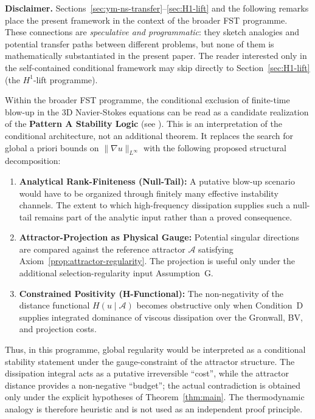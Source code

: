\documentclass[12pt,a4paper]{article}
\theoremstyle{definition}
\theoremstyle{plain}
\theoremstyle{remark}
\begin{document}
\noindent\textbf{Disclaimer.}\;
Sections~\ref{sec:ym-ns-transfer}--\ref{sec:H1-lift} and the following remarks
place the present framework in the context of the broader FST programme.
These connections are \emph{speculative and programmatic}: they sketch
analogies and potential transfer paths between different problems, but
none of them is mathematically substantiated in the present paper.
The reader interested only in the self-contained conditional framework
may skip directly to Section~\ref{sec:H1-lift} (the $H^1$-lift programme).

\medskip
Within the broader FST programme, the conditional exclusion of finite-time blow-up in the 3D Navier-Stokes equations can be read as a candidate realization of the \textbf{Pattern A Stability Logic} (see \cite{FST-Unified2026}). This is an interpretation of the conditional architecture, not an additional theorem. It replaces the search for global a priori bounds on $\|\nabla u\|_{L^\infty}$ with the following proposed structural decomposition:

\begin{enumerate}[label=\alph*)]
    \item \textbf{Analytical Rank-Finiteness (Null-Tail):} A putative blow-up scenario would have to be organized through finitely many effective instability channels. The extent to which high-frequency dissipation supplies such a null-tail remains part of the analytic input rather than a proved consequence.
    \item \textbf{Attractor-Projection as Physical Gauge:} Potential singular directions are compared against the reference attractor $\mathcal{A}$ satisfying Axiom~\ref{prop:attractor-regularity}. The projection is useful only under the additional selection-regularity input Assumption~G.
    \item \textbf{Constrained Positivity (H-Functional):} The non-negativity of the distance functional $H(u \mid \mathcal{A})$ becomes obstructive only when Condition~D supplies integrated dominance of viscous dissipation over the Gronwall, BV, and projection costs.
\end{enumerate}

Thus, in this programme, global regularity would be interpreted as a conditional stability statement under the gauge-constraint of the attractor structure. The dissipation integral acts as a putative irreversible ``cost'', while the attractor distance provides a non-negative ``budget''; the actual contradiction is obtained only under the explicit hypotheses of Theorem~\ref{thm:main}. The thermodynamic analogy is therefore heuristic and is not used as an independent proof principle.
\end{document}
